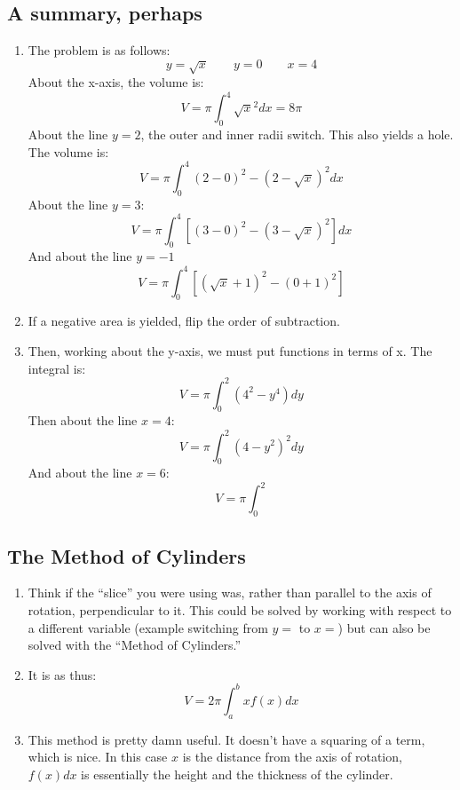 \documentclass[11pt]{article}
\begin{document}
\subsection{A summary, perhaps}
\begin{enumerate}
	\item The problem is as follows:
		\[ y = \sqrt{x} \qquad y = 0 \qquad x = 4 \]
		About the x-axis, the volume is:
		\[ V = \pi \int_{0}^{4}\sqrt{x}^2 dx = 8\pi \]
		About the line $y = 2$, the outer and inner radii switch.  This also
		yields a hole.  The volume is:
		\[ V = \pi \int_{0}^{4}(2-0)^2-(2 - \sqrt{x})^2 dx \]
		About the line $y = 3$:
		\[ V = \pi \int_{0}^{4}\left[ (3 - 0)^2 - (3 - \sqrt{x})^2 \right] dx \]
		And about the line $y = -1$
		\[ V = \pi \int_{0}^{4}\left[ (\sqrt{x}+1)^2 - (0+1)^2\right] \]
	\item If a negative area is yielded, flip the order of subtraction.
	\item Then, working about the y-axis, we must put functions in terms of x.
		The integral is:
		\[ V = \pi\int_{0}^{2}(4^2 - y^4)dy \]
		Then about the line $x = 4$:
		\[ V = \pi \int_{0}^{2}(4 - y^2)^2 dy \]
		And about the line $x = 6$:
		\[ V = \pi \int_{0}^{2}\]
\end{enumerate}
\subsection{The Method of Cylinders}
\begin{enumerate}
	\item Think if the ``slice'' you were using was, rather than parallel to
		the axis of rotation, perpendicular to it.  This could be solved by
		working with respect to a different variable (example switching from 
		$y=$ to $x=$) but can also be solved  with the ``Method of Cylinders.''
	\item It is as thus:
		\[
			V = 2 \pi \int_{a}^{b}x f(x) dx
		\]
	\item This method is pretty damn useful.  It doesn't have a squaring 
		of a term, which is nice.  In this case $x$ is the distance from 
		the axis of rotation, $f(x)dx$ is essentially the height and the
		thickness of the cylinder.
\end{enumerate}
\end{document}
